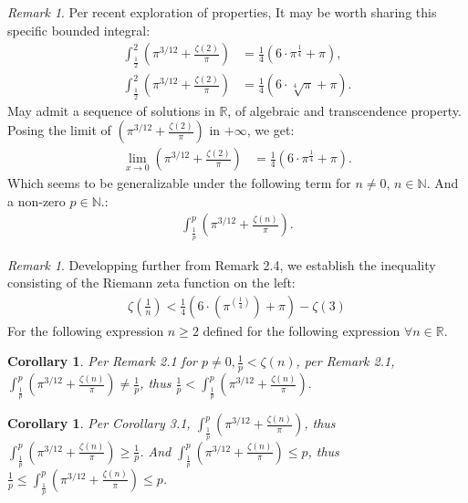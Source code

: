 \documentclass[10pt]{article}
\theoremstyle{plain}
\newtheorem{corollary}[theorem]{Corollary}
\theoremstyle{definition}
\theoremstyle{remark}
\newtheorem{remark}[theorem]{Remark}
\begin{document}
\begin{remark}
	Per recent exploration of properties, It may be worth sharing this specific bounded integral:
	\begin{align*}
		\int_{\frac{1}{2}}^{2} (\pi^{3/12} + \frac{\zeta(2)}{\pi}) &= \frac{1}{4} (6 \cdot \pi^{\frac{1}{4}} + \pi),\\
		\int_{\frac{1}{2}}^{2} (\pi^{3/12} + \frac{\zeta(2)}{\pi}) &= \frac{1}{4} (6 \cdot \sqrt[4]{\pi} + \pi).
	\end{align*}
	May admit a sequence of solutions in $\mathbb{R}$, of algebraic and transcendence property. Posing the limit of $(\pi^{3/12} + \frac{\zeta(2)}{\pi})$ in $+\infty$, we get:
	\begin{align*}
	\lim_{x \to 0} (\pi^{3/12} + \frac{\zeta(2)}{\pi}) &= \frac{1}{4} (6 \cdot \pi^{\frac{1}{4}} + \pi).
	\end{align*}
	Which seems to be generalizable under the following term for $n \neq 0, \, n \in \mathbb{N}.$ And a non-zero $p \in \mathbb{N}.$:
	\begin{align*}
		\int_{\frac{1}{p}}^{p} (\pi^{3/12} + \frac{\zeta(n)}{\pi}).
	\end{align*}
\end{remark}

\begin{remark}
	Developping further from Remark 2.4, we establish the inequality consisting of the Riemann zeta function on the left:
	\begin{align*}
		\zeta(\frac{1}{n}) < \frac{1}{4}(6 \cdot (\pi^(\frac{1}{4})) + \pi) - \zeta(3)
	\end{align*}
	For the following expression $n \geq 2$ defined for the following expression $\forall n \in \mathbb{R}$.
\end{remark}

\begin{corollary}
	Per Remark 2.1 for $p \neq 0, \frac{1}{p} < \zeta(n)$, per Remark 2.1, $\int_{\frac{1}{p}}^{p} (\pi^{3/12} + \frac{\zeta(n)}{\pi}) \neq \frac{1}{p}$, thus $\frac{1}{p} < \int_{\frac{1}{p}}^{p} (\pi^{3/12} + \frac{\zeta(n)}{\pi}).$
\end{corollary}

\begin{corollary}
	Per Corollary 3.1, $\int_{\frac{1}{p}}^{p} (\pi^{3/12} + \frac{\zeta(n)}{\pi})$, thus $\int_{\frac{1}{p}}^{p} (\pi^{3/12} + \frac{\zeta(n)}{\pi}) \geq \frac{1}{p}$. And $\int_{\frac{1}{p}}^{p} (\pi^{3/12} + \frac{\zeta(n)}{\pi}) \leq p$, thus $\frac{1}{p} \leq \int_{\frac{1}{p}}^{p} (\pi^{3/12} + \frac{\zeta(n)}{\pi}) \leq p$.
\end{corollary}
\end{document}
